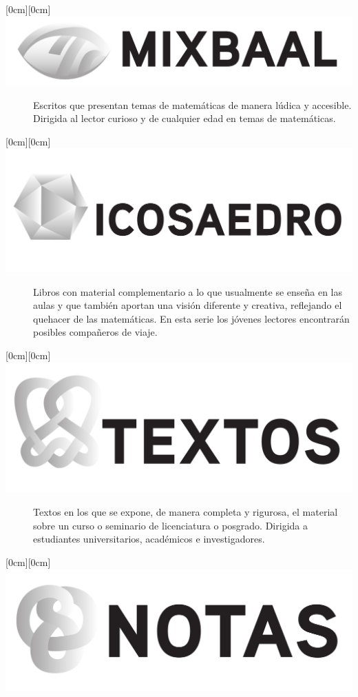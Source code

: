 \begin{description}
\item[{\raisebox{-.7ex}[0cm][0cm]
    {\includegraphics[height=\baselineskip]{papirhos-figs/mixbaal.pdf}}}]
  Escritos que presentan temas de matemáticas de manera lúdica y
  accesible. Dirigida al lector curioso y de cualquier edad en temas
  de matemáticas.
\vfill
\item[{\raisebox{-1.55ex}[0cm][0cm]
    {\includegraphics[height=2\baselineskip]{papirhos-figs/icosaedro.pdf}}}]
  Libros con material complementario a lo que usualmente se enseña en
  las aulas y que también aportan una visión diferente y creativa,
  reflejando el quehacer de las matemáticas. En esta serie los jóvenes
  lectores encontrarán posibles compañeros de viaje.
\vfill
\item[{\raisebox{-.9ex}[0cm][0cm]
    {\includegraphics[height=1.5\baselineskip]{papirhos-figs/textos.pdf}}}]
  Textos en los que se expone, de manera completa y rigurosa, el
  material sobre un curso o seminario de licenciatura o
  posgrado. Dirigida a estudiantes universitarios, académicos e
  investigadores.
\vfill
\item[{\raisebox{-.95ex}[0cm][0cm]
    {\includegraphics[height=1.2\baselineskip]{papirhos-figs/notas.pdf}}}]

\end{description}

